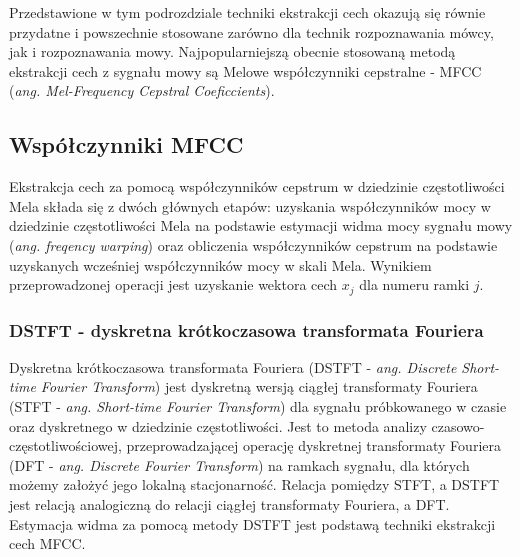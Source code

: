 Przedstawione w tym podrozdziale techniki ekstrakcji cech okazują się równie przydatne i powszechnie stosowane zarówno dla technik rozpoznawania mówcy, jak i rozpoznawania mowy. Najpopularniejszą obecnie stosowaną metodą ekstrakcji cech z sygnału mowy są  Melowe współczynniki cepstralne -  MFCC (\textit{ang. Mel-Frequency Cepstral Coeficcients}). 

\subsection{Współczynniki MFCC}
\label{mfcc}

Ekstrakcja cech za pomocą współczynników cepstrum w dziedzinie częstotliwości Mela składa się z dwóch głównych etapów: uzyskania współczynników mocy w dziedzinie częstotliwości Mela na podstawie estymacji widma mocy sygnału mowy (\textit{ang. freqency warping}) oraz obliczenia współczynników cepstrum na podstawie uzyskanych wcześniej współczynników mocy w skali Mela. Wynikiem przeprowadzonej operacji jest uzyskanie wektora cech $x_j$ dla numeru ramki $j$.

\subsubsection{DSTFT - dyskretna krótkoczasowa transformata Fouriera}
Dyskretna krótkoczasowa transformata Fouriera (DSTFT - \textit{ang. Discrete Short-time Fourier Transform}) jest dyskretną wersją ciągłej transformaty Fouriera (STFT - \textit{ang. Short-time Fourier Transform}) dla sygnału próbkowanego w czasie oraz dyskretnego w dziedzinie częstotliwości. Jest to metoda analizy czasowo-częstotliwościowej, przeprowadzającej operację dyskretnej transformaty Fouriera (DFT - \textit{ang. Discrete Fourier Transform}) na ramkach sygnału, dla których możemy założyć jego lokalną stacjonarność. Relacja pomiędzy STFT, a DSTFT jest relacją analogiczną do relacji ciągłej transformaty Fouriera, a DFT.  Estymacja widma za pomocą metody DSTFT jest podstawą techniki ekstrakcji cech MFCC.

